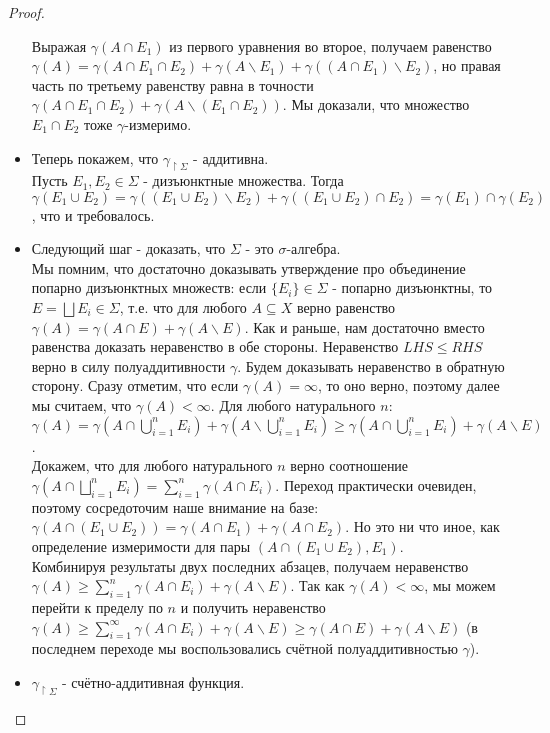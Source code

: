 \documentclass[a4paper]{article}
\theoremstyle{indented}
\theoremstyle{definition}
\theoremstyle{remark}
\begin{document}
\begin{proof}
\begin{itemize}
Выражая $\gamma(A \cap E_1)$ из первого уравнения во второе, получаем равенство $\gamma(A) = \gamma(A \cap E_1 \cap E_2) + \gamma (A \backslash E_1)+\gamma((A \cap E_1) \backslash E_2)$, но правая часть по третьему равенству равна в точности $\gamma(A \cap E_1 \cap E_2)+\gamma(A \backslash (E_1 \cap E_2))$. Мы доказали, что множество $E_1 \cap E_2$ тоже $\gamma$-измеримо.
\item Теперь покажем, что $\gamma_{\upharpoonright \Sigma}$ - аддитивна.
\\
Пусть $E_1, E_2 \in \Sigma$ - дизъюнктные множества. Тогда $\gamma(E_1 \cup E_2) = \gamma((E_1 \cup E_2) \backslash E_2)+\gamma((E_1 \cup E_2) \cap E_2) = \gamma(E_1)\cap \gamma(E_2)$, что и требовалось.
\item Следующий шаг - доказать, что $\Sigma$ - это $\sigma$-алгебра.
\\
Мы помним, что достаточно доказывать утверждение про объединение попарно дизъюнктных множеств: если $\{E_i\} \in \Sigma$ - попарно дизъюнктны, то $E=\bigsqcup E_i \in \Sigma$, т.е. что для любого $A \subseteq X$ верно равенство $\gamma(A) = \gamma(A \cap E)+\gamma(A \backslash E)$. Как и раньше, нам достаточно вместо равенства доказать неравенство в обе стороны. Неравенство $LHS \leq RHS$ верно в силу полуаддитивности $\gamma$. Будем доказывать неравенство в обратную сторону. Сразу отметим, что если $\gamma(A)=\infty$, то оно верно, поэтому далее мы считаем, что $\gamma(A)< \infty$. Для любого натурального $n$: $\gamma(A) = \gamma(A \cap \bigcup_{i=1}^n E_i)+\gamma(A \backslash \bigcup_{i=1}^n E_i) \geq \gamma(A \cap \bigcup_{i=1}^n E_i)+\gamma(A \backslash E)$. 
\\
Докажем, что для любого натурального $n$ верно соотношение $\gamma(A \cap \bigsqcup_{i=1}^n E_i) = \sum_{i=1}^n \gamma(A \cap E_i)$. Переход практически очевиден, поэтому сосредоточим наше внимание на базе: $\gamma(A \cap (E_1 \cup E_2)) = \gamma(A \cap E_1) + \gamma(A \cap E_2)$. Но это ни что иное, как определение измеримости для пары $(A \cap (E_1 \cup E_2), E_1)$. 
\\
Комбинируя результаты двух последних абзацев, получаем неравенство $\gamma(A) \geq \sum_{i=1}^n \gamma(A \cap E_i)+\gamma(A \backslash E)$. Так как $\gamma(A) < \infty$, мы можем перейти к пределу по $n$ и получить неравенство $\gamma(A) \geq \sum_{i=1}^{\infty} \gamma(A \cap E_i)+\gamma(A \backslash E) \geq \gamma(A \cap E) + \gamma(A \backslash E)$ (в последнем переходе мы воспользовались счётной полуаддитивностью $\gamma$).
\item $\gamma_{\upharpoonright \Sigma}$ - счётно-аддитивная функция.

\end{itemize}
\end{proof}
\end{document}
